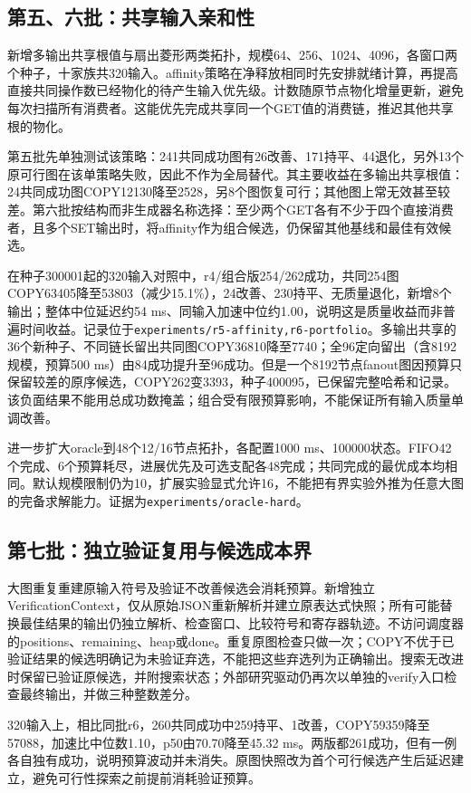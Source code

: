 \documentclass[UTF8,11pt,fontset=fandol]{ctexart}
\begin{document}
\subsection{第五、六批：共享输入亲和性}
新增多输出共享根值与扇出菱形两类拓扑，规模64、256、1024、4096，各窗口两个种子，十家族共320输入。affinity策略在净释放相同时先安排就绪计算，再提高直接共同操作数已经物化的待产生输入优先级。计数随原节点物化增量更新，避免每次扫描所有消费者。这能优先完成共享同一个GET值的消费链，推迟其他共享根的物化。

第五批先单独测试该策略：241共同成功图有26改善、171持平、44退化，另外13个原可行图在该单策略失败，因此不作为全局替代。其主要收益在多输出共享根值：24共同成功图COPY12130降至2528，另8个图恢复可行；其他图上常无效甚至较差。第六批按结构而非生成器名称选择：至少两个GET各有不少于四个直接消费者，且多个SET输出时，将affinity作为组合候选，仍保留其他基线和最佳有效候选。

在种子300001起的320输入对照中，r4/组合版254/262成功，共同254图COPY63405降至53803（减少15.1\%），24改善、230持平、无质量退化，新增8个输出；整体中位延迟约54 ms、同输入加速中位约1.00，说明这是质量收益而非普遍时间收益。记录位于\texttt{experiments/r5-affinity,r6-portfolio}。多输出共享的36个新种子、不同链长留出共同图COPY36810降至7740；全96定向留出（含8192规模，预算500 ms）由84成功提升至96成功。但是一个8192节点fanout图因预算只保留较差的原序候选，COPY262变3393，种子400095，已保留完整哈希和记录。该负面结果不能用总成功数掩盖；组合受有限预算影响，不能保证所有输入质量单调改善。

进一步扩大oracle到48个12/16节点拓扑，各配置1000 ms、100000状态。FIFO42个完成、6个预算耗尽，进展优先及可选支配各48完成；共同完成的最优成本均相同。默认规模限制仍为10，扩展实验显式允许16，不能把有界实验外推为任意大图的完备求解能力。证据为\texttt{experiments/oracle-hard}。

\subsection{第七批：独立验证复用与候选成本界}
大图重复重建原输入符号及验证不改善候选会消耗预算。新增独立VerificationContext，仅从原始JSON重新解析并建立原表达式快照；所有可能替换最佳结果的输出仍独立解析、检查窗口、比较符号和寄存器轨迹。不访问调度器的positions、remaining、heap或done。重复原图检查只做一次；COPY不优于已验证结果的候选明确记为未验证弃选，不能把这些弃选列为正确输出。搜索无改进时保留已验证原候选，并附搜索状态；外部研究驱动仍再次以单独的verify入口检查最终输出，并做三种整数差分。

320输入上，相比同批r6，260共同成功中259持平、1改善，COPY59359降至57088，加速比中位数1.10，p50由70.70降至45.32 ms。两版都261成功，但有一例各自独有成功，说明预算波动并未消失。原图快照改为首个可行候选产生后延迟建立，避免可行性探索之前提前消耗验证预算。
\end{document}
